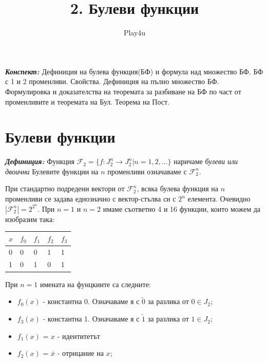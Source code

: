 \documentclass[11pt]{article} %
\title{2. Булеви функции}
\author{Play4u}
\newcommand{\italicBold}[1]{\textbf{\emph{#1}}}
\newcommand{\definition}{\italicBold{Дефиниция: }}
\newcommand{\curlies}[1]{\{#1\}}
\begin{document}
\maketitle

\italicBold{Конспект:} Дефиниция на булева функция(БФ) и формула над множество БФ. БФ с 1 и 2 променливи. Свойства. Дефиниция на пълно множество БФ. Формулировка и доказателства на теоремата за разбиване на БФ по част от променливите и теоремата на Бул. Теорема на Пост.

\section{Булеви функции}
\definition Функция $\mathcal{F}_{2} = \curlies{f:J^{n}_{2} \to J^{n}_{2} | n = 1, 2, ...}$ наричаме \textit{булеви или двоични} Булевите функции на $n$ променливи означаваме с $\mathcal{F}^{n}_{2}$. \par

При стандартно подредени вектори от $\mathcal{F}^{n}_{2}$, всяка булева функция на $n$ променливи се задава еднозначно с вектор-стълва си с $2^{n}$ елемента. Очевидно $|\mathcal{F}^{n}_{2}| = 2^{2^n}$. При $n = 1$ и $n = 2$ имаме съответно 4 и 16 функции, които можем да изобразим така: 

\begin{table}[!ht]
\centering
\begin{tabular}{|l|llll|}
\hline
$x$ & $f_{0}$ & $f_{1}$ & $f_{2}$ &  $f_{3}$\\ \hline
0 & 0 & 0 & 1 & 1  \\
1 & 0 & 1 & 0 & 1 \\ \hline
\end{tabular}
\end{table}

При $n = 1$ имената на фунцкиите са следните: \\
\begin{itemize}
	\item $f_{0}(x)$ - константна 0. Означаваме я с $\tilde{0}$ за разлика от $0 \in J_{2}$; \\
	\item $f_{3}(x)$ - константна 1. Означаваме я с $\tilde{1}$ за разлика от $1 \in J_{2}$; \\
	\item $f_{1}(x)$ = $x$ - идентитетът \\
	\item $f_{2}(x)$ = $\bar{x}$ - отрицание на $x$; 
\end{itemize} \par
\end{document}
